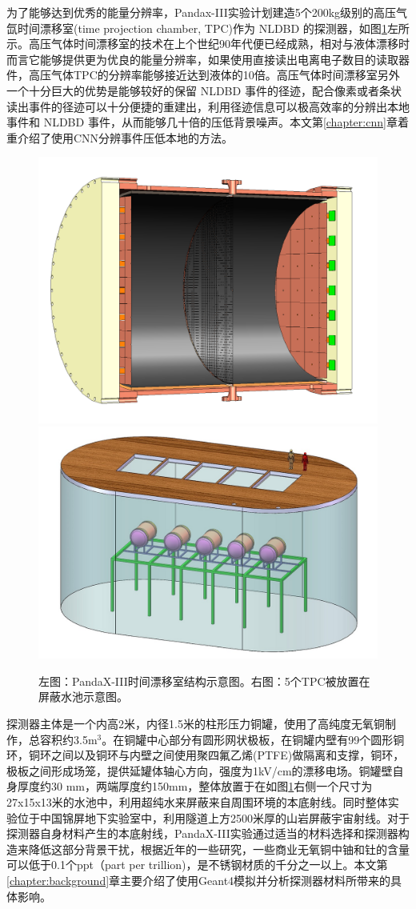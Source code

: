 为了能够达到优秀的能量分辨率，Pandax-III实验计划建造5个200kg级别的高压气氙时间漂移室(time projection chamber, TPC)作为 NLDBD 的探测器，如图\ref{fig:detector}左所示。高压气体时间漂移室的技术在上个世纪90年代便已经成熟，相对与液体漂移时而言它能够提供更为优良的能量分辨率，如果使用直接读出电离电子数目的读取器件，高压气体TPC的分辨率能够接近达到液体的10倍。高压气体时间漂移室另外一个十分巨大的优势是能够较好的保留 NLDBD 事件的径迹，配合像素或者条状读出事件的径迹可以十分便捷的重建出，利用径迹信息可以极高效率的分辨出本地事件和 NLDBD 事件，从而能够几十倍的压低背景噪声。本文第\ref{chapter:cnn}章着重介绍了使用CNN分辨事件压低本地的方法。

\begin{figure}[tbp]
    \centering
    \includegraphics[width=0.4\columnwidth]{pic/fig1.png}
    \includegraphics[width=0.4\columnwidth]{pic/fig2.jpg}
    \caption{左图：PandaX-III时间漂移室结构示意图。右图：5个TPC被放置在屏蔽水池示意图。\supercite{cdr}}
    \label{fig:detector}
\end{figure}
    
探测器主体是一个内高2米，内径1.5米的柱形压力铜罐，使用了高纯度无氧铜制作，总容积约3.5m$^3$。在铜罐中心部分有圆形网状极板，在铜罐内壁有99个圆形铜环，铜环之间以及铜环与内壁之间使用聚四氟乙烯(PTFE)做隔离和支撑，铜环，极板之间形成场笼，提供延罐体轴心方向，强度为1kV/cm的漂移电场。铜罐壁自身厚度约30
mm，两端厚度约150mm，整体放置于在如图\ref{fig:detector}右侧一个尺寸为27x15x13米的水池中，利用超纯水来屏蔽来自周围环境的本底射线。同时整体实验位于中国锦屏地下实验室中，利用隧道上方2500米厚的山岩屏蔽宇宙射线。对于探测器自身材料产生的本底射线，PandaX-III实验通过适当的材料选择和探测器构造来降低这部分背景干扰，根据近年的一些研究，一些商业无氧铜中铀和钍的含量可以低于0.1个ppt（part per trillion)\supercite{abgrall2016majorana}，是不锈钢材质的千分之一以上。本文第\ref{chapter:background}章主要介绍了使用Geant4模拟并分析探测器材料所带来的具体影响。

